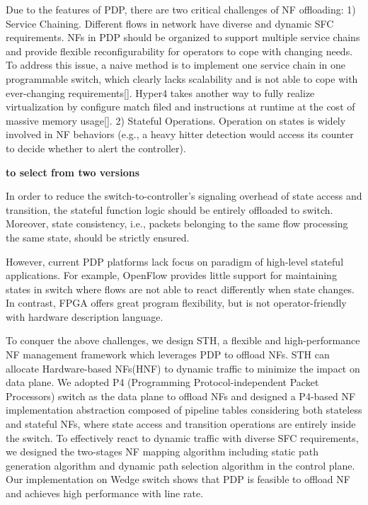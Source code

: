 \documentclass[10pt, conference, letterpaper]{IEEEtran}
\begin{document}
Due to the features of PDP, there are two critical challenges of NF offloading: 
1) Service Chaining. Different flows in network have diverse and dynamic SFC requirements. NFs in PDP should be organized to support multiple service chains and provide flexible reconfigurability for operators to cope with changing needs. To address this issue, a naive method is to implement one service chain in one programmable switch, which clearly lacks scalability and is not able to cope with ever-changing requirements[]. Hyper4 takes another way to fully realize virtualization by configure match filed and instructions at runtime at the cost of massive memory usage[].
2) Stateful Operations. Operation on states is widely involved in NF behaviors (e.g., a heavy hitter detection would access its counter to decide whether to alert the controller). 

\textbf{to select from two versions}

In order to reduce the switch-to-controller's signaling overhead of state access and transition, the stateful function logic should be entirely offloaded to switch. Moreover, state consistency, i.e., packets belonging to the same flow processing the same state, should be strictly ensured.

However, current PDP platforms lack focus on paradigm of high-level stateful applications. For example, OpenFlow provides little support for maintaining states in switch where flows are not able to react differently when state changes. In contrast, FPGA offers great program flexibility, but is not operator-friendly with hardware description language.


To conquer the above challenges, we design STH, a flexible and high-performance NF management framework which leverages PDP to offload NFs. STH can allocate Hardware-based NFs(HNF) to dynamic traffic to minimize the impact on data plane. 
We adopted P4 (Programming Protocol-independent Packet Processors) switch as the data plane to offload NFs and designed a P4-based NF implementation abstraction composed of pipeline tables considering both stateless and stateful NFs, where state access and transition operations are entirely inside the switch. To effectively react to dynamic traffic with diverse SFC requirements, we designed the two-stages NF mapping algorithm including static path generation algorithm and dynamic path selection algorithm in the control plane. Our implementation on Wedge switch shows that PDP is feasible to offload NF and achieves high performance with line rate.
\end{document}
